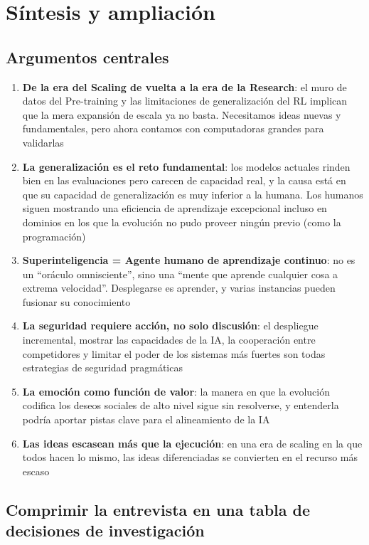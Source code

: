 \documentclass[a4paper]{article}
\begin{document}
\section{Síntesis y ampliación}

\subsection{Argumentos centrales}

\begin{enumerate}
    \item \textbf{De la era del Scaling de vuelta a la era de la Research}: el muro de datos del Pre-training y las limitaciones de generalización del RL implican que la mera expansión de escala ya no basta. Necesitamos ideas nuevas y fundamentales, pero ahora contamos con computadoras grandes para validarlas
    \item \textbf{La generalización es el reto fundamental}: los modelos actuales rinden bien en las evaluaciones pero carecen de capacidad real, y la causa está en que su capacidad de generalización es muy inferior a la humana. Los humanos siguen mostrando una eficiencia de aprendizaje excepcional incluso en dominios en los que la evolución no pudo proveer ningún previo (como la programación)
    \item \textbf{Superinteligencia = Agente humano de aprendizaje continuo}: no es un ``oráculo omnisciente'', sino una ``mente que aprende cualquier cosa a extrema velocidad''. Desplegarse es aprender, y varias instancias pueden fusionar su conocimiento
    \item \textbf{La seguridad requiere acción, no solo discusión}: el despliegue incremental, mostrar las capacidades de la IA, la cooperación entre competidores y limitar el poder de los sistemas más fuertes son todas estrategias de seguridad pragmáticas
    \item \textbf{La emoción como función de valor}: la manera en que la evolución codifica los deseos sociales de alto nivel sigue sin resolverse, y entenderla podría aportar pistas clave para el alineamiento de la IA
    \item \textbf{Las ideas escasean más que la ejecución}: en una era de scaling en la que todos hacen lo mismo, las ideas diferenciadas se convierten en el recurso más escaso
\end{enumerate}

\subsection{Comprimir la entrevista en una tabla de decisiones de investigación}
\end{document}
